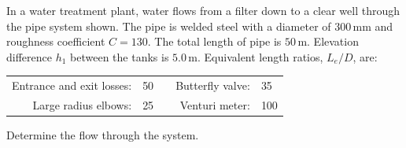 \documentclass[9pt,xcolor={svgnames, x11names},mathpazo, professionalfonts]{beamer}
\begin{document}

\begin{frame}
	
	\centering
	
	\begin{myexam}{}{}
		
		In a water treatment plant, water flows from a filter down to a clear well through the pipe system shown. The pipe is welded steel with a diameter of $300\,\text{mm}$ and roughness coefficient $C=130$. The total length of pipe is $50\,\text{m}$. Elevation difference $h_1$ between the tanks is $5.0\,$m.
		\pars
		Equivalent length ratios, $L_e/D$, are:
		\pars
		\begin{center}
			\begin{tabular}{rlcrl}
				Entrance and exit losses: & 50 &   & Butterfly valve: & 35  \\
				Large radius elbows:      & 25 &   & Venturi meter:   & 100 
			\end{tabular}
		\end{center}
		\parm
		Determine the flow through the system.
	\end{myexam}
	
\end{frame}

\end{document}
